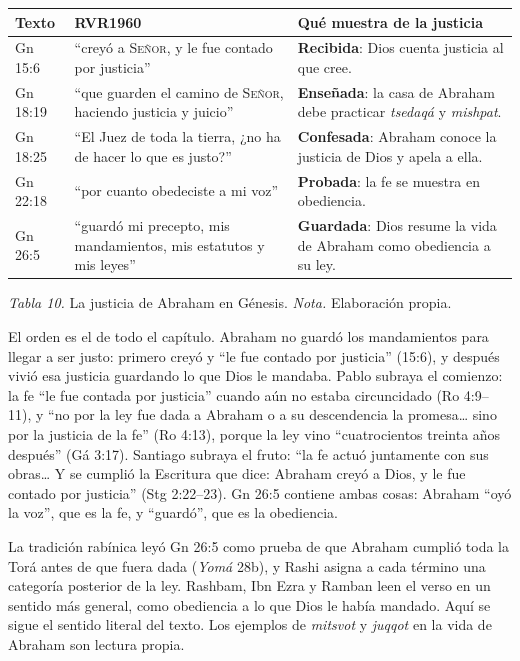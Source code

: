 \documentclass[11pt,letterpaper]{article}
\newcommand{\SENOR}{\textsc{Señor}}
\begin{document}
\begin{center}\small\renewcommand{\arraystretch}{1.2}
\begin{tabular}{@{}L{2.0cm}L{5.4cm}L{6.8cm}@{}}
\toprule
\textbf{Texto} & \textbf{RVR1960} & \textbf{Qué muestra de la justicia} \\ \midrule
Gn 15:6 & ``creyó a \SENOR, y le fue contado por justicia'' & \textbf{Recibida}: Dios cuenta justicia al que cree. \\
Gn 18:19 & ``que guarden el camino de \SENOR, haciendo justicia y juicio'' & \textbf{Enseñada}: la casa de Abraham debe practicar \emph{tsedaqá} y \emph{mishpat}. \\
Gn 18:25 & ``El Juez de toda la tierra, ¿no ha de hacer lo que es justo?'' & \textbf{Confesada}: Abraham conoce la justicia de Dios y apela a ella. \\
Gn 22:18 & ``por cuanto obedeciste a mi voz'' & \textbf{Probada}: la fe se muestra en obediencia. \\
Gn 26:5 & ``guardó mi precepto, mis mandamientos, mis estatutos y mis leyes'' & \textbf{Guardada}: Dios resume la vida de Abraham como obediencia a su ley. \\
\bottomrule
\end{tabular}\par
{\footnotesize\color{gris}\textit{Tabla 10.} La justicia de Abraham en Génesis. \textit{Nota.} Elaboración propia.}
\end{center}

El orden es el de todo el capítulo. Abraham no guardó los mandamientos para llegar a ser justo: primero creyó y ``le fue contado por justicia'' (15:6), y después vivió esa justicia guardando lo que Dios le mandaba. Pablo subraya el comienzo: la fe ``le fue contada por justicia'' cuando aún no estaba circuncidado (Ro 4:9--11), y ``no por la ley fue dada a Abraham o a su descendencia la promesa\ldots{} sino por la justicia de la fe'' (Ro 4:13), porque la ley vino ``cuatrocientos treinta años después'' (Gá 3:17). Santiago subraya el fruto: ``la fe actuó juntamente con sus obras\ldots{} Y se cumplió la Escritura que dice: Abraham creyó a Dios, y le fue contado por justicia'' (Stg 2:22--23). Gn 26:5 contiene ambas cosas: Abraham ``oyó la voz'', que es la fe, y ``guardó'', que es la obediencia.

\begin{nota}[Precisión]
La tradición rabínica leyó Gn 26:5 como prueba de que Abraham cumplió toda la Torá antes de que fuera dada (\emph{Yomá} 28b), y Rashi asigna a cada término una categoría posterior de la ley. Rashbam, Ibn Ezra y Ramban leen el verso en un sentido más general, como obediencia a lo que Dios le había mandado. Aquí se sigue el sentido literal del texto. Los ejemplos de \emph{mitsvot} y \emph{juqqot} en la vida de Abraham son lectura propia.
\end{nota}
\end{document}
